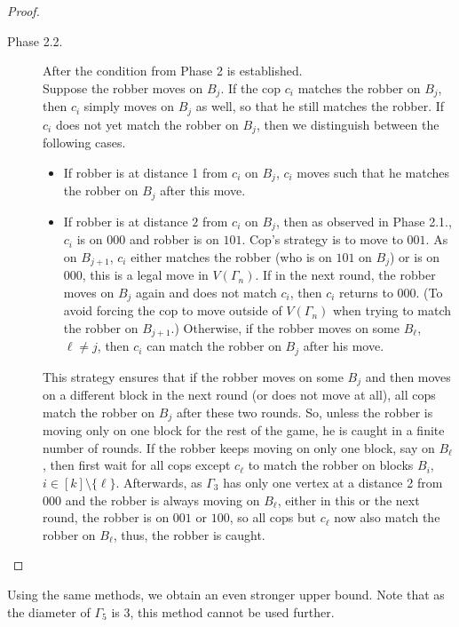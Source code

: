 \documentclass[11pt]{article}
\begin{document}
\begin{proof}
\begin{description}
\begin{description}
            \item[Phase 2.2.] After the condition from Phase 2 is established.\\
            Suppose the robber moves on $B_j$. If the cop $c_i$ matches the robber on $B_j$, then $c_i$ simply moves on $B_j$ as well, so that he still matches the robber. If $c_i$ does not yet match the robber on $B_j$, then we distinguish between the following cases.
            \begin{itemize}
                \item If robber is at distance 1 from $c_i$ on $B_j$, $c_i$ moves such that he matches the robber on $B_j$ after this move.
                \item If robber is at distance $2$ from $c_i$ on $B_j$, then as observed in Phase 2.1., $c_i$ is on $000$ and robber is on $101$. Cop's strategy is to move to $001$. As on $B_{j+1}$, $c_i$ either matches the robber (who is on $101$ on $B_j$) or is on $000$, this is a legal move in $V(\Gamma_n)$. If in the next round, the robber moves on $B_j$ again and does not match $c_i$, then $c_i$ returns to $000$. (To avoid forcing the cop to move outside of $V(\Gamma_n)$ when trying to match the robber on $B_{j+1}$.) Otherwise, if the robber moves on some $B_\ell$, $\ell \neq j$, then $c_i$ can match the robber on $B_j$ after his move. 
            \end{itemize}
            This strategy ensures that if the robber moves on some $B_j$ and then moves on a different block in the next round (or does not move at all), all cops match the robber on $B_j$ after these two rounds. So, unless the robber is moving only on one block for the rest of the game, he is caught in a finite number of rounds. If the robber keeps moving on only one block, say on $B_\ell$, then first wait for all cops except $c_\ell$ to match the robber on blocks $B_i$, $i \in [k] \setminus \{\ell\}$. Afterwards, as $\Gamma_3$ has only one vertex at a distance 2 from $000$ and the robber is always moving on $B_\ell$, either in this or the next round, the robber is on $001$ or $100$, so all cops but $c_\ell$ now also match the robber on $B_\ell$, thus, the robber is caught. \hfill \qedhere
        \end{description}
    \end{description}
\end{proof}

Using the same methods, we obtain an even stronger upper bound. Note that as the diameter of $\Gamma_5$ is 3, this method cannot be used further.
\end{document}
